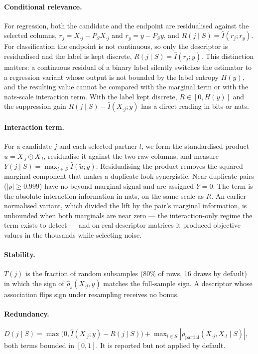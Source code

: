 \paragraph{Conditional relevance.}
For regression, both the candidate and the endpoint are residualised against the
selected columns, $r_j = X_{\cdot j} - P_S X_{\cdot j}$ and
$r_y = y - P_S y$, and $R(j \mid S) = \hat{I}(r_j; r_y)$. For classification the
endpoint is not continuous, so only the descriptor is residualised and the label
is kept discrete, $R(j \mid S) = \hat{I}(r_j; y)$. This distinction matters: a
continuous residual of a binary label silently switches the estimator to a
regression variant whose output is not bounded by the label entropy $H(y)$, and
the resulting value cannot be compared with the marginal term or with the
nats-scale interaction term. With the label kept discrete, $R \in [0, H(y)]$ and
the suppression gain $R(j\mid S) - \hat{I}(X_{\cdot j}; y)$ has a direct reading
in bits or nats.

\paragraph{Interaction term.}
For a candidate $j$ and each selected partner $l$, we form the standardised
product $u = \tilde{X}_{\cdot j} \odot \tilde{X}_{\cdot l}$, residualise it
against the two raw columns, and measure
$Y(j \mid S) = \max_{l \in S} \hat{I}(\tilde{u}; y)$. Residualising the product
removes the squared marginal component that makes a duplicate look synergistic.
Near-duplicate pairs ($|\rho| \ge 0.999$) have no beyond-marginal signal and are
assigned $Y = 0$. The term is the absolute interaction information in nats, on the
same scale as $R$. An earlier normalised variant, which divided the lift by the
pair's marginal information, is unbounded when both marginals are near zero ---
the interaction-only regime the term exists to detect --- and on real descriptor
matrices it produced objective values in the thousands while selecting noise.

\paragraph{Stability.}
$T(j)$ is the fraction of random subsamples (80\% of rows, 16 draws by default)
in which the sign of $\hat{\rho}_s(X_{\cdot j}, y)$ matches the full-sample sign.
A descriptor whose association flips sign under resampling receives no bonus.

\paragraph{Redundancy.}
$D(j \mid S) = \max\big(0, \hat{I}(X_{\cdot j}; y) - R(j \mid S)\big)
 + \max_{l \in S} |\rho_{\text{partial}}(X_{\cdot j}, X_{\cdot l} \mid S)|$,
both terms bounded in $[0, 1]$. It is reported but not applied by default.

